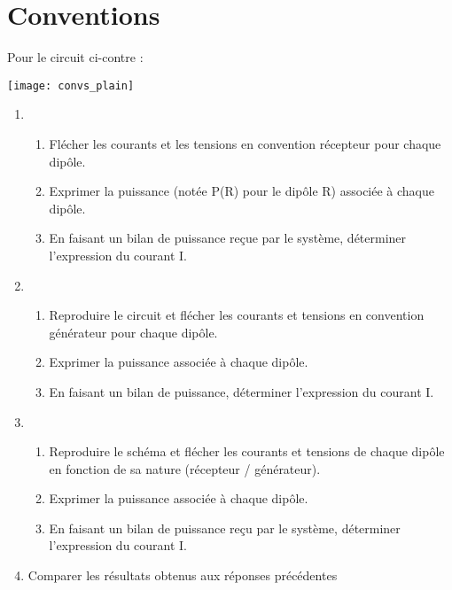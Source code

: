 \documentclass[a4paper, 12pt, final, garamond]{book}
\begin{document}
\section{Conventions}

\begin{minipage}{0.30\linewidth}
    Pour le circuit ci-contre :
\end{minipage}
\begin{minipage}{0.70\linewidth}
    \begin{center}
        \texttt{[image: convs\_plain]}
    \end{center}
\end{minipage}
\begin{enumerate}
    \item
        \begin{enumerate}
            \item Flécher les courants et les tensions en convention récepteur
                pour chaque dipôle.
            \item Exprimer la puissance (notée P(R) pour le dipôle R) associée à
                chaque dipôle.
            \item En faisant un bilan de puissance reçue par le système,
                déterminer l'expression du courant I.
        \end{enumerate}
    \item
        \begin{enumerate}
            \item Reproduire le circuit et flécher les courants et tensions en
                convention générateur pour chaque dipôle.
            \item Exprimer la puissance associée à chaque dipôle.
            \item En faisant un bilan de puissance, déterminer l'expression du
                courant I.
        \end{enumerate}
    \item
        \begin{enumerate}
            \item Reproduire le schéma et flécher les courants et tensions de
                chaque dipôle en fonction de sa nature (récepteur / générateur).
            \item Exprimer la puissance associée à chaque dipôle.
            \item En faisant un bilan de puissance reçu par le système,
                déterminer l'expression du courant I.
        \end{enumerate}
    \item Comparer les résultats obtenus aux réponses précédentes
\end{enumerate}
\end{document}
